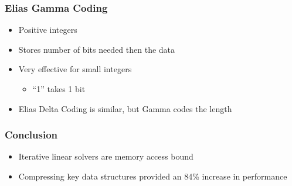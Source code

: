 \documentclass{beamer}
\begin{document}
\begin{frame}
	\frametitle{Elias Gamma Coding}
	\begin{itemize}
		\item Positive integers
		\item Stores number of bits needed then the data
		\item Very effective for small integers
		\begin{itemize}
			\item ``1'' takes 1 bit
		\end{itemize}
		\item Elias Delta Coding is similar, but Gamma codes the length 
	\end{itemize}
\end{frame}

\begin{frame}
	\frametitle{Conclusion}
	\begin{itemize}
		\item Iterative linear solvers are memory access bound
		\item Compressing key data structures provided an 84\% increase in performance
	\end{itemize}
\end{frame}
\end{document}
